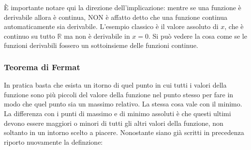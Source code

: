 È importante notare qui la direzione dell'implicazione: mentre se una funzione è derivabile allora è continua, NON è affatto detto che una funzione continua automaticamente sia derivabile. L'esempio classico è il valore assoluto di $x$, che è continuo su tutto $\mathbb{R}$ ma non è derivabile in $x = 0$. Si può vedere la cosa come se le funzioni derivabili fossero un sottoinsieme delle funzioni continue.


\subsubsection{Teorema di Fermat} \label{TeoremaFermat}
In pratica basta che esista un itorno di quel punto in cui tutti i valori della funzione sono più piccoli del valore della funzione nel punto stesso per fare in modo che quel punto sia un massimo relativo. La stessa cosa vale con il minimo. La differenza con i punti di massimo e di minimo assoluti è che questi ultimi devono essere maggiori o minori di tutti gli altri valori della funzione, non soltanto in un intorno scelto a piacere. Nonostante siano già scritti in precedenza riporto nuovamente la definzione:

